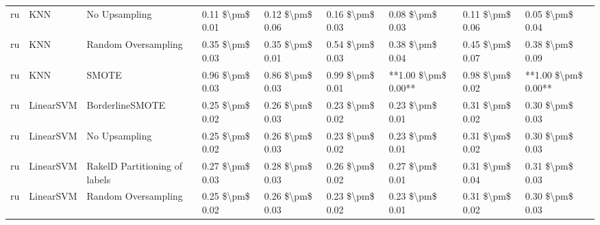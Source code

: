 \begin{tabular}{lllllllll}
      ru &                             KNN &                 No Upsampling &     0.11 \$\textbackslash pm\$ 0.01 &           0.12 \$\textbackslash pm\$ 0.06 &       0.16 \$\textbackslash pm\$ 0.03 &        0.08 \$\textbackslash pm\$ 0.03 &                         0.11 \$\textbackslash pm\$ 0.06 &     0.05 \$\textbackslash pm\$ 0.04 \\
      ru &                             KNN &           Random Oversampling &     0.35 \$\textbackslash pm\$ 0.03 &           0.35 \$\textbackslash pm\$ 0.01 &       0.54 \$\textbackslash pm\$ 0.03 &        0.38 \$\textbackslash pm\$ 0.04 &                         0.45 \$\textbackslash pm\$ 0.07 &     0.38 \$\textbackslash pm\$ 0.09 \\
      ru &                             KNN &                         SMOTE &     0.96 \$\textbackslash pm\$ 0.03 &           0.86 \$\textbackslash pm\$ 0.03 &       0.99 \$\textbackslash pm\$ 0.01 &    **1.00 \$\textbackslash pm\$ 0.00** &                         0.98 \$\textbackslash pm\$ 0.02 & **1.00 \$\textbackslash pm\$ 0.00** \\
      ru &                       LinearSVM &               BorderlineSMOTE &     0.25 \$\textbackslash pm\$ 0.02 &           0.26 \$\textbackslash pm\$ 0.03 &       0.23 \$\textbackslash pm\$ 0.02 &        0.23 \$\textbackslash pm\$ 0.01 &                         0.31 \$\textbackslash pm\$ 0.02 &     0.30 \$\textbackslash pm\$ 0.03 \\
      ru &                       LinearSVM &                 No Upsampling &     0.25 \$\textbackslash pm\$ 0.02 &           0.26 \$\textbackslash pm\$ 0.03 &       0.23 \$\textbackslash pm\$ 0.02 &        0.23 \$\textbackslash pm\$ 0.01 &                         0.31 \$\textbackslash pm\$ 0.02 &     0.30 \$\textbackslash pm\$ 0.03 \\
      ru &                       LinearSVM & RakelD Partitioning of labels &     0.27 \$\textbackslash pm\$ 0.03 &           0.28 \$\textbackslash pm\$ 0.03 &       0.26 \$\textbackslash pm\$ 0.02 &        0.27 \$\textbackslash pm\$ 0.01 &                         0.31 \$\textbackslash pm\$ 0.04 &     0.31 \$\textbackslash pm\$ 0.03 \\
      ru &                       LinearSVM &           Random Oversampling &     0.25 \$\textbackslash pm\$ 0.02 &           0.26 \$\textbackslash pm\$ 0.03 &       0.23 \$\textbackslash pm\$ 0.02 &        0.23 \$\textbackslash pm\$ 0.01 &                         0.31 \$\textbackslash pm\$ 0.02 &     0.30 \$\textbackslash pm\$ 0.03 \\

\end{tabular}
